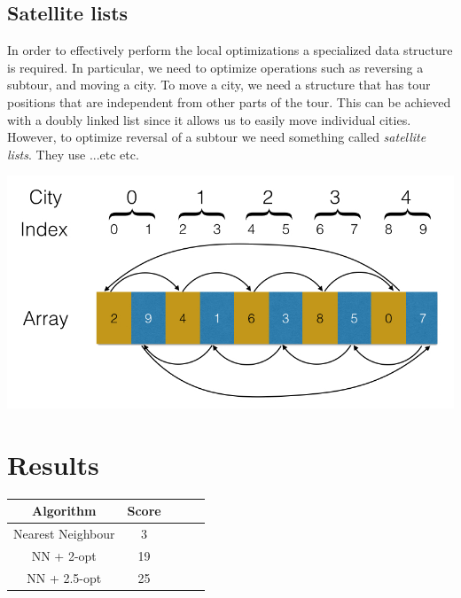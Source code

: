 \documentclass[paper=a4, fontsize=11pt,numbers=endperiod]{scrartcl} %
\numberwithin{equation}{section} %
\numberwithin{figure}{section} %
\numberwithin{table}{section} %
\begin{document}
\subsection{Satellite lists}
In order to effectively perform the local optimizations a specialized data structure is required. In particular, we need to optimize operations such as reversing a subtour, and moving a city. To move a city, we need a structure that has tour positions that are independent from other parts of the tour. This can be achieved with a doubly linked list since it allows us to easily move individual cities. However, to optimize reversal of a subtour we need something called \emph{satellite lists}. They use ...etc etc.

\begin{center}
\includegraphics[scale=0.3]{satellite}
\end{center}




\section{Results}

    \begin{tabular}{|c|c|c|c|c|}
    \hline
    \textbf{Algorithm} & \textbf{Score} \\ \hline
    Nearest Neighbour & 3 \\ \hline
    NN + 2-opt & 19 \\ \hline
    NN + 2.5-opt & 25 \\ \hline
    \end{tabular}
    \hspace{10pt}
\end{document}
